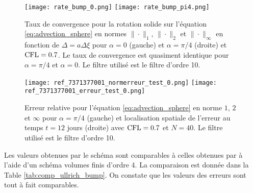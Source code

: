 \begin{figure}[htbp]
\begin{center}
\texttt{[image: rate\_bump\_0.png]}
\texttt{[image: rate\_bump\_pi4.png]}
\end{center}
\caption{Taux de convergence pour la rotation solide sur l'équation \eqref{eq:advection_sphere} en normes $\| \cdot\|_1$, $\| \cdot\|_2$ et $\| \cdot\|_{\infty}$ en fonction de $\Delta = a \Delta \xi$ pour $\alpha = 0$ (gauche) et $\alpha = \pi / 4$ (droite) et $\text{CFL} = 0.7$. Le taux de convergence est quasiment identique pour $\alpha = \pi/4$ et $\alpha=0$. Le filtre utilisé est le filtre d'ordre 10.}
\label{fig:rate_bump}
\end{figure}

\begin{figure}[htbp]
\begin{center}
\texttt{[image: ref\_7371377001\_normerreur\_test\_0.png]}
\texttt{[image: ref\_7371377001\_erreur\_test\_0.png]}
\end{center}
\caption{Erreur relative pour l'équation \eqref{eq:advection_sphere} en norme $1$, $2$ et $\infty$ pour $\alpha = \pi/4$ (gauche) et localisation spatiale de l'erreur au temps $t=12$ jours (droite) avec $\text{CFL} = 0.7$ et $N=40$. Le filtre utilisé est le filtre d'ordre 10.}
\label{fig:erreur_bump}
\end{figure}

Les valeurs obtenues par le schéma sont comparables à celles obtenues par \cite{Ullrich2010, Ullrich2011} à l'aide d'un schéma volumes finis d'ordre 4. La comparaison est donnée dans la Table \ref{tab:comp_ullrich_bump}. On constate que les valeurs des erreurs sont tout à fait comparables.

